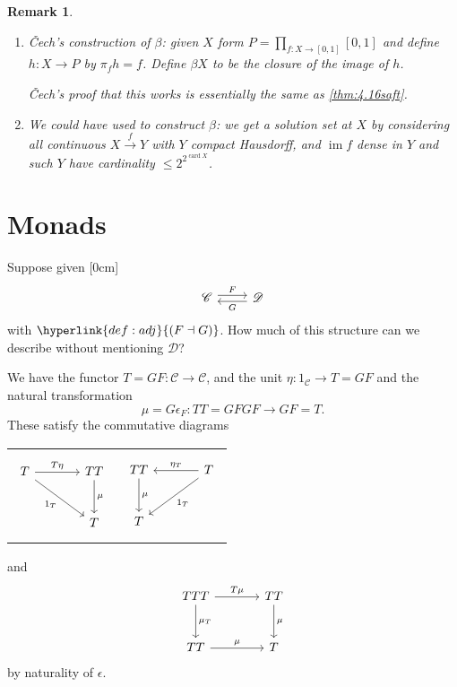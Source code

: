 \documentclass{article}
\newcommand{\cc}{\mathscr{C}}
\let\to\longrightarrow
\newtheorem{nremark}[nthm]{Remark}
\begin{document}
\begin{nremark}\leavevmode
  \begin{enumerate}[label=(\alph*)]
    \item \v{C}ech's construction of $\beta$: given $X$ form $P = \prod_{f: X \to [0,1]} [0,1]$ and define $h: X \to P$ by $\pi_f h = f$.
      Define $\beta X$ to be the closure of the image of $h$.

      \v{C}ech's proof that this works is essentially the same as \cref{thm:4.16saft}.
    \item We could have used  to construct $\beta$: we get a solution set at $X$ by considering all continuous $X \overset{f}\to Y$ with $Y$ compact Hausdorff, and $\operatorname{im} f$ dense in $Y$ and such $Y$ have cardinality $\leq 2^{2^{\operatorname{card} X}}$.
  \end{enumerate}
\end{nremark}
\clearpage
\section{Monads}
Suppose given
[0cm]
\begin{equation*}
  \begin{tikzcd}
    \mathscr{C} \rar[shift left]{F} & \mathscr{D} \lar[shift left]{G}
  \end{tikzcd}
\end{equation*}
with $\hyperlink{def:adj}{(F \dashv G)}$.
How much of this structure can we describe without mentioning $\mathscr{D}$?

We have the functor $T= GF: \mathscr{C} \to \cc$, and the unit $\eta: 1_\mathscr{C} \to T = GF$ and the natural transformation
\begin{equation*}
  \mu = G\epsilon_F: TT = GFGF \to GF = T.
\end{equation*}
These satisfy the commutative diagrams

\noindent
\begin{tabularx}{\linewidth}{XX}
\begin{equation}
  \begin{tikzcd}[sep=large, ampersand replacement=\&]
    T \rar{T\eta} \drar[']{1_T} \& TT \dar{\mu}\\
                             \& T
  \end{tikzcd} \label{eq:monad1}
\end{equation}
&
\begin{equation}
  \begin{tikzcd}[sep=large, ampersand replacement=\&]
    TT \dar{\mu} \& T \lar[']{\eta_T} \arrow[dl, "1_T"] \\
    T
  \end{tikzcd} \label{eq:monad2}
\end{equation}
\end{tabularx}
and
\begin{equation}
  \begin{tikzcd}[sep=large]
    TTT \rar{T\mu} \dar{\mu_T} & TT \dar{\mu} \\
    TT \rar{\mu} & T
  \end{tikzcd} \label{eq:monad3}
\end{equation}
by naturality of $\epsilon$.
\end{document}
